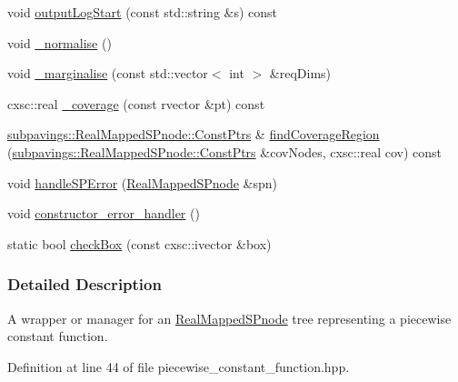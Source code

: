 \begin{DoxyCompactItemize}
\item 
void \hyperlink{classsubpavings_1_1PiecewiseConstantFunction_a9327e86ac242a9af67266686cc107370}{output\-Log\-Start} (const std\-::string \&s) const 
\item 
void \hyperlink{classsubpavings_1_1PiecewiseConstantFunction_ae3058b35de92dbf4f0606e9a51012373}{\-\_\-normalise} ()
\item 
void \hyperlink{classsubpavings_1_1PiecewiseConstantFunction_a893720267a24aa9cf6dbabbcc9e92b4a}{\-\_\-marginalise} (const std\-::vector$<$ int $>$ \&req\-Dims)
\item 
cxsc\-::real \hyperlink{classsubpavings_1_1PiecewiseConstantFunction_a00ec6162ad7be5fd75b9f71df9e6010e}{\-\_\-coverage} (const rvector \&pt) const 
\item 
\hyperlink{classsubpavings_1_1RealMappedSPnode_a5fc20ec0cd33f031e874f50251156e65}{subpavings\-::\-Real\-Mapped\-S\-Pnode\-::\-Const\-Ptrs} \& \hyperlink{classsubpavings_1_1PiecewiseConstantFunction_a739e54236b59b4c1cbe8d5d20f5f4950}{find\-Coverage\-Region} (\hyperlink{classsubpavings_1_1RealMappedSPnode_a5fc20ec0cd33f031e874f50251156e65}{subpavings\-::\-Real\-Mapped\-S\-Pnode\-::\-Const\-Ptrs} \&cov\-Nodes, cxsc\-::real cov) const 
\item 
void \hyperlink{classsubpavings_1_1PiecewiseConstantFunction_ac6bc781088b8a8554bc6598f25e75988}{handle\-S\-P\-Error} (\hyperlink{classsubpavings_1_1RealMappedSPnode}{\-Real\-Mapped\-S\-Pnode} \&spn)
\item 
void \hyperlink{classsubpavings_1_1PiecewiseConstantFunction_a498990673c6fb4821bbfa6e26f3ebc04}{constructor\-\_\-error\-\_\-handler} ()
\item 
static bool \hyperlink{classsubpavings_1_1PiecewiseConstantFunction_a2dfb56b2c05c101ea7a27781e37762ee}{check\-Box} (const cxsc\-::ivector \&box)
\end{DoxyCompactItemize}


\subsubsection{\-Detailed \-Description}
\-A wrapper or manager for an \hyperlink{classsubpavings_1_1RealMappedSPnode}{\-Real\-Mapped\-S\-Pnode} tree representing a piecewise constant function. 



\-Definition at line 44 of file piecewise\-\_\-constant\-\_\-function.\-hpp.



